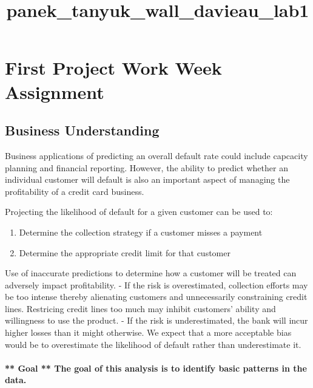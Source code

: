 \documentclass[11pt]{article}
\title{panek\_tanyuk\_wall\_davieau\_lab1}
\providecommand{\tightlist}{%
      \setlength{\itemsep}{0pt}\setlength{\parskip}{0pt}}
\begin{document}
    
    
    \maketitle
    
    

    
    \section{First Project Work Week
Assignment}\label{first-project-work-week-assignment}

    \subsection{Business Understanding}\label{business-understanding}

Business applications of predicting an overall default rate could
include capcacity planning and financial reporting. However, the ability
to predict whether an individual customer will default is also an
important aspect of managing the profitability of a credit card
business.

Projecting the likelihood of default for a given customer can be used
to:

\begin{enumerate}
\def\labelenumi{\arabic{enumi}.}
\tightlist
\item
  Determine the collection strategy if a customer misses a payment
\item
  Determine the appropriate credit limit for that customer
\end{enumerate}

Use of inaccurate predictions to determine how a customer will be
treated can adversely impact profitability. - If the risk is
overestimated, collection efforts may be too intense thereby alienating
customers and unnecessarily constraining credit lines. Restricing credit
lines too much may inhibit customers' ability and willingness to use the
product. - If the risk is underestimated, the bank will incur higher
losses than it might otherwise. We expect that a more acceptable bias
would be to overestimate the likelihood of default rather than
underestimate it.

\paragraph{** Goal ** The goal of this analysis is to identify basic
patterns in the
data.}\label{goal-the-goal-of-this-analysis-is-to-identify-basic-patterns-in-the-data.}
\end{document}

